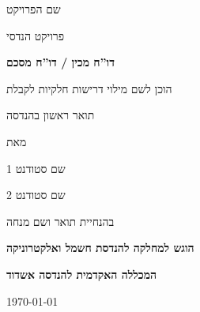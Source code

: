 \documentclass[12pt]{book}
\numberwithin{equation}{section}
\numberwithin{figure}{section}
\numberwithin{table}{section}
\begin{document}
\begin{hebrew}
\vspace*{0.1cm}
\begin{center}
\fontsize{16pt}{19pt}
\selectfont

{\Large   שם הפרויקט}
\vspace*{0.5cm}

{\Large פרויקט הנדסי}

\vspace*{1cm}

\fontsize{14pt}{17pt}
\selectfont

\textbf{דו''ח מכין / דו''ח מסכם}
\vspace*{1.5cm}

\fontsize{10pt}{12pt}
\selectfont

הוכן לשם מילוי דרישות חלקיות לקבלת

תואר ראשון בהנדסה 

\vspace*{1cm}

מאת

\vspace*{1cm}

\fontsize{16pt}{19pt}
\selectfont

{\Large שם סטודנט 1}

\vspace*{0.5cm}

{\Large שם סטודנט 2}

\fontsize{12pt}{12pt}
\selectfont

\vspace*{1cm}

בהנחיית תואר ושם מנחה

\vspace*{2cm}

\fontsize{14pt}{17pt}
\selectfont

\textbf{הוגש למחלקה להנדסת חשמל ואלקטרוניקה}
  
\textbf{המכללה האקדמית להנדסה אשדוד}

\vspace*{3cm}

\begin{english}\today\end{english} ~~~~~~~~~~~~~~~~~~~~~~~~~~~~~\Hebrewtoday


\end{center}

\newpage

\vspace*{0.1cm}
\begin{center}
\fontsize{16pt}{19pt}
\selectfont


\end{center}
\end{hebrew}
\end{document}
